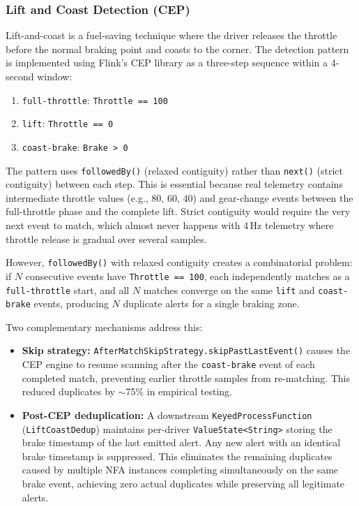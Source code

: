 \documentclass[a4paper,twocolumn]{article}
\begin{document}
\subsubsection{Lift and Coast Detection (CEP)}

Lift-and-coast is a fuel-saving technique where the driver releases the
throttle before the normal braking point and coasts to the corner. The
detection pattern is implemented using Flink's CEP library as a
three-step sequence within a 4-second window:

\begin{enumerate}
  \item \texttt{full-throttle}: \texttt{Throttle == 100}
  \item \texttt{lift}: \texttt{Throttle == 0}
  \item \texttt{coast-brake}: \texttt{Brake > 0}
\end{enumerate}

The pattern uses \texttt{followedBy()} (relaxed contiguity) rather than
\texttt{next()} (strict contiguity) between each step. This is essential
because real telemetry contains intermediate throttle values (e.g., 80,
60, 40) and gear-change events between the full-throttle phase and the
complete lift. Strict contiguity would require the very next event to
match, which almost never happens with 4\,Hz telemetry where throttle
release is gradual over several samples.

However, \texttt{followedBy()} with relaxed contiguity creates a
combinatorial problem: if $N$ consecutive events have
\texttt{Throttle == 100}, each independently matches as a
\texttt{full-throttle} start, and all $N$ matches converge on the same
\texttt{lift} and \texttt{coast-brake} events, producing $N$ duplicate
alerts for a single braking zone.

Two complementary mechanisms address this:
\begin{itemize}
  \item \textbf{Skip strategy:}
    \texttt{AfterMatchSkipStrategy.skipPastLastEvent()} causes the CEP
    engine to resume scanning after the \texttt{coast-brake} event of each
    completed match, preventing earlier throttle samples from re-matching.
    This reduced duplicates by $\sim$75\% in empirical testing.
  \item \textbf{Post-CEP deduplication:} A downstream
    \texttt{KeyedProcessFunction} (\texttt{LiftCoastDedup}) maintains per-driver
    \texttt{ValueState<String>} storing the brake timestamp of the last
    emitted alert. Any new alert with an identical brake timestamp is
    suppressed. This eliminates the remaining duplicates caused by
    multiple NFA instances completing simultaneously on the same brake
    event, achieving zero actual duplicates while preserving all
    legitimate alerts.
\end{itemize}
\end{document}
